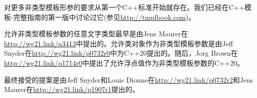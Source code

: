 
对更多非类型模板形参的要求从第一个C++标准开始就存在。我们已经在C++模板-完整指南的第一版中讨论过它(参见\url{http://tmplbook.com})。

允许非类型模板参数的任意文字类型最早是由Jens Maurer在\url{http://wg21.link/n3413}中提出的。允许类对象作为非类型模板参数是由Jeff Snyder在\url{http://wg21.link/p0732r0}中为C++20提出的。随后，Jorg Brown在\url{http://wg21.link/p1714r0}中提出了允许浮点值作为非类型模板参数的C++20。

最终接受的提案是由Jeff Snyder和Louis Dionne在\url{http://wg21.link/p0732r2}和Jens Maurer在\url{http://wg21.link/p1907r1}提出的。
